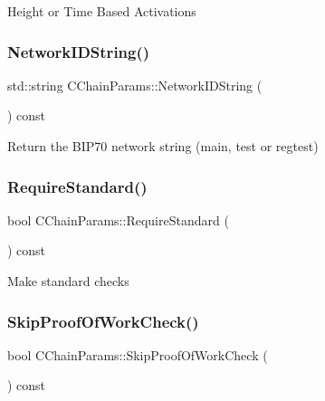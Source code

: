 Height or Time Based Activations \mbox{\label{class_c_chain_params_a2c02cc73f7fe9369cee9a39a0fd5b710}} 
\subsubsection{\texorpdfstring{NetworkIDString()}{NetworkIDString()}}
{\footnotesize\ttfamily std\+::string C\+Chain\+Params\+::\+Network\+I\+D\+String (\begin{DoxyParamCaption}{ }\end{DoxyParamCaption}) const\hspace{0.3cm}{\ttfamily [inline]}}

Return the B\+I\+P70 network string (main, test or regtest) \mbox{\label{class_c_chain_params_a30c1b60e515537b01810e175844d852f}} 
\subsubsection{\texorpdfstring{RequireStandard()}{RequireStandard()}}
{\footnotesize\ttfamily bool C\+Chain\+Params\+::\+Require\+Standard (\begin{DoxyParamCaption}{ }\end{DoxyParamCaption}) const\hspace{0.3cm}{\ttfamily [inline]}}

Make standard checks \mbox{\label{class_c_chain_params_a79b6cb67af99906669f7219a14a83cf7}} 
\subsubsection{\texorpdfstring{SkipProofOfWorkCheck()}{SkipProofOfWorkCheck()}}
{\footnotesize\ttfamily bool C\+Chain\+Params\+::\+Skip\+Proof\+Of\+Work\+Check (\begin{DoxyParamCaption}{ }\end{DoxyParamCaption}) const\hspace{0.3cm}{\ttfamily [inline]}}

